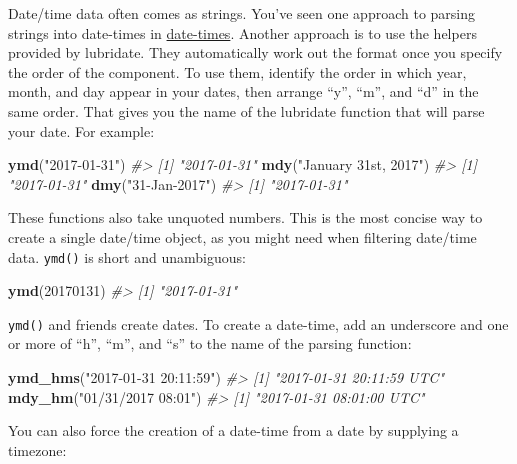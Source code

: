 \documentclass[]{book}
\newenvironment{Shaded}{\begin{snugshade}}{\end{snugshade}}
\newcommand{\KeywordTok}[1]{\textcolor[rgb]{0.13,0.29,0.53}{\textbf{{#1}}}}
\newcommand{\DecValTok}[1]{\textcolor[rgb]{0.00,0.00,0.81}{{#1}}}
\newcommand{\StringTok}[1]{\textcolor[rgb]{0.31,0.60,0.02}{{#1}}}
\newcommand{\CommentTok}[1]{\textcolor[rgb]{0.56,0.35,0.01}{\textit{{#1}}}}
\newcommand{\NormalTok}[1]{{#1}}
\begin{document}
Date/time data often comes as strings. You've seen one approach to
parsing strings into date-times in
\protect\hyperlink{readr-datetimes}{date-times}. Another approach is to
use the helpers provided by lubridate. They automatically work out the
format once you specify the order of the component. To use them,
identify the order in which year, month, and day appear in your dates,
then arrange ``y'', ``m'', and ``d'' in the same order. That gives you
the name of the lubridate function that will parse your date. For
example:

\begin{Shaded}
\begin{Highlighting}[]
\KeywordTok{ymd}\NormalTok{(}\StringTok{"2017-01-31"}\NormalTok{)}
\CommentTok{#> [1] "2017-01-31"}
\KeywordTok{mdy}\NormalTok{(}\StringTok{"January 31st, 2017"}\NormalTok{)}
\CommentTok{#> [1] "2017-01-31"}
\KeywordTok{dmy}\NormalTok{(}\StringTok{"31-Jan-2017"}\NormalTok{)}
\CommentTok{#> [1] "2017-01-31"}
\end{Highlighting}
\end{Shaded}

These functions also take unquoted numbers. This is the most concise way
to create a single date/time object, as you might need when filtering
date/time data. \texttt{ymd()} is short and unambiguous:

\begin{Shaded}
\begin{Highlighting}[]
\KeywordTok{ymd}\NormalTok{(}\DecValTok{20170131}\NormalTok{)}
\CommentTok{#> [1] "2017-01-31"}
\end{Highlighting}
\end{Shaded}

\texttt{ymd()} and friends create dates. To create a date-time, add an
underscore and one or more of ``h'', ``m'', and ``s'' to the name of the
parsing function:

\begin{Shaded}
\begin{Highlighting}[]
\KeywordTok{ymd_hms}\NormalTok{(}\StringTok{"2017-01-31 20:11:59"}\NormalTok{)}
\CommentTok{#> [1] "2017-01-31 20:11:59 UTC"}
\KeywordTok{mdy_hm}\NormalTok{(}\StringTok{"01/31/2017 08:01"}\NormalTok{)}
\CommentTok{#> [1] "2017-01-31 08:01:00 UTC"}
\end{Highlighting}
\end{Shaded}

You can also force the creation of a date-time from a date by supplying
a timezone:
\end{document}
